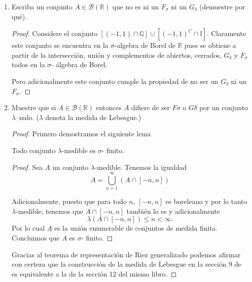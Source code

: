 \documentclass[letter,twoside,12pt]{article}
\numberwithin{equation}{section}
\begin{document}
\begin{enumerate}[label = (\textbf{\arabic*.})]
\begin{enumerate}[label = (\textbf{\roman*.})]
\begin{proof}
Sin embargo si tomo la intersección de las dos colecciones su resultado es vacío y esto contradice el hecho que $ \mathbb{R} $ es un espacio de Baire.

\end{proof}

\item Escriba un conjunto $ A \in \mathcal{B}(\mathbb{R}) $ que no es ni un $ F_\sigma $ ni un $ G_\delta $ (demuestre por qué).
\begin{proof}
Considere el conjunto $[(-1,1) \cap \mathbb{Q}] \cup [(-1,1)^C \cap \mathbb{I}]$. Claramente este conjunto se encuentra en la $ \sigma $-algebra de Borel de $\mathbb{R}$ pues se obtiene a partir de la intersección, unión y complementos de abiertos, cerrados, $G_\delta$ y $F_\sigma $ todos en la $ \sigma $- álgebra de Borel.

Pero adicionalmente este conjunto cumple la propiedad de no ser un $G_\delta$ ni un $F_\sigma$. 
\end{proof}

\item Muestre que si $ A \in \mathcal{B}(\mathbb{R}) $ entonces $ A $ difiere de ser $ F\sigma $ o $ G\delta $ por un conjunto $ \lambda $–nulo. ($ \lambda $
denota la medida de Lebesgue.)

\begin{proof}
Primero demostramos el siguiente lema

\begin{lemma}\label{le:finito}
Todo conjunto $ \lambda $-medible es $ \sigma $- finito.
\end{lemma}
\begin{proof}
Sea $A$ un conjunto $\lambda $-medible. Tenemos la igualdad
\begin{equation}
A = \bigcup_{n=1}^\infty (A \cap [-n,n])
\end{equation}

Adicionalmente, puesto que para todo $ n $, $ [-n,n] $ es boreleano y por lo tanto $ \lambda $-medible, tenemos que $A \cap [-n,n]$ también lo es y adicionalmente $$ \lambda(A \cap [-n,n]) \leq n < \infty. $$ 
Por lo cual $A$ es la unión enumerable de conjuntos de medida finita. Concluimos que $ A $ es $ \sigma $- finito.
\end{proof}

Gracias al teorema de representación de Riez generalizado \cite[Teorema 12.35]{hewwit} podemos afirmar con certeza que la construcción de la medida de Lebesgue en la sección 9 de \cite{hewwit} es equivalente a la de la sección 12 del mismo libro. 


\end{proof}
\end{enumerate}
\end{enumerate}
\end{document}
